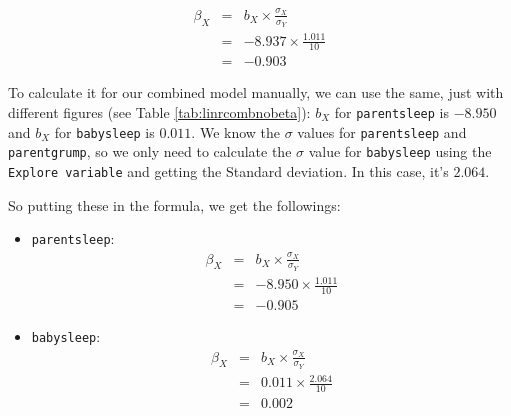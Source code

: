 \documentclass[
  11pt,
  a4paper,
  twoside,symmetric,openright]{book}
\providecommand{\tightlist}{%
  \setlength{\itemsep}{0pt}\setlength{\parskip}{0pt}}
\theoremstyle{break}
\theoremstyle{break}
\begin{document}
\[
\begin{array}{rcl}
\beta_X &=& b_X \times \frac{\sigma_X}{\sigma_Y}
    \\
    &=& -8.937 \times \frac{1.011}{10}
    \\
    &=& -0.903
\end{array}
\]

To calculate it for our combined model manually, we can use the same, just with different figures (see Table \ref{tab:linrcombnobeta}): \(b_X\) for \texttt{parentsleep} is \(-8.950\) and \(b_X\) for \texttt{babysleep} is \(0.011\). We know the \(\sigma\) values for \texttt{parentsleep} and \texttt{parentgrump}, so we only need to calculate the \(\sigma\) value for \texttt{babysleep} using the \texttt{Explore\ variable} and getting the Standard deviation. In this case, it's \(2.064\).

So putting these in the formula, we get the followings:

\begin{itemize}
\tightlist
\item
  \texttt{parentsleep}:
  \[
  \begin{array}{rcl}
  \beta_X &=& b_X \times \frac{\sigma_X}{\sigma_Y}
    \\
    &=& -8.950 \times \frac{1.011}{10}
    \\
    &=& -0.905
  \end{array}
  \]
\item
  \texttt{babysleep}:
  \[
  \begin{array}{rcl}
  \beta_X &=& b_X \times \frac{\sigma_X}{\sigma_Y}
    \\
    &=& 0.011 \times \frac{2.064}{10}
    \\
    &=& 0.002
  \end{array}
  \]
\end{itemize}
\end{document}
